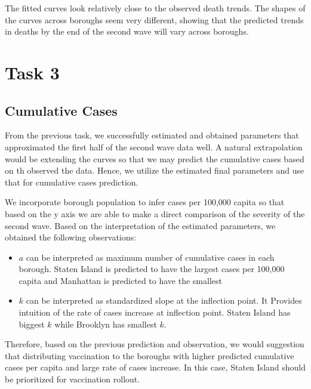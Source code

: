 \documentclass[
]{article}
\providecommand{\tightlist}{%
  \setlength{\itemsep}{0pt}\setlength{\parskip}{0pt}}
\begin{document}
The fitted curves look relatively close to the observed death trends.
The shapes of the curves across boroughs seem very different, showing
that the predicted trends in deaths by the end of the second wave will
vary across boroughs.

\hypertarget{task-3}{%
\section{Task 3}\label{task-3}}

\hypertarget{cumulative-cases-1}{%
\subsection{Cumulative Cases}\label{cumulative-cases-1}}

From the previous task, we successfully estimated and obtained
parameters that approximated the first half of the second wave data
well. A natural extrapolation would be extending the curves so that we
may predict the cumulative cases based on th observed the data. Hence,
we utilize the estimated final parameters and use that for cumulative
cases prediction.

We incorporate borough population to infer cases per 100,000 capita so
that based on the y axis we are able to make a direct comparison of the
severity of the second wave. Based on the interpretation of the
estimated parameters, we obtained the following observations:

\begin{itemize}
\tightlist
\item
  \(a\) can be interpreted as maximum number of cumulative cases in each
  borough. Staten Island is predicted to have the largest cases per
  100,000 capita and Manhattan is predicted to have the smallest
\item
  \(k\) can be interpreted as standardized slope at the inflection
  point. It Provides intuition of the rate of cases increase at
  inflection point. Staten Island has biggest \(k\) while Brooklyn has
  smallest \(k\).
\end{itemize}

Therefore, based on the previous prediction and observation, we would
suggestion that distributing vaccination to the boroughs with higher
predicted cumulative cases per capita and large rate of cases increase.
In this case, Staten Island should be prioritized for vaccination
rollout.
\end{document}
